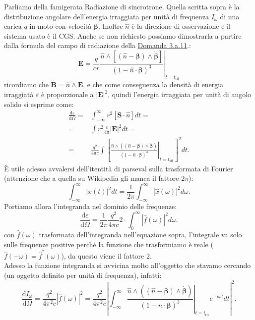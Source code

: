 \label{sec:3.a.14}
Parliamo della famigerata Radiazione di sincrotrone.
Quella scritta sopra è la distribuzione angolare dell'energia irraggiata per unità di frequenza $I_{\omega}$ di una carica $q$ in moto con velocità  $\boldsymbol{\beta}$. Inoltre $\hat{n}$ è la direzione di osservazione e il sistema usato è il CGS. 
Anche se non richiesto possiamo dimostrarla a partire dalla formula del campo di radiazione della \hyperref[sec:3.a.11]{Domanda 3.a.11}.:
\[
	\boldsymbol{E}= \left. \frac{q}{cr}
	\frac{\hat{n}\wedge\left[\left(\hat{n}-\boldsymbol{\beta}\right)\wedge\dot{\boldsymbol{\beta}}\right]}
	{\left(1-\hat{n}\cdot \boldsymbol{\beta}\right)^3} \right|_{t=t_{\text{rit}}}
\]
ricordiamo che $\boldsymbol{B}=\hat{n}\wedge \boldsymbol{E}$, e che come conseguenza la densità di energia irraggiatà $\varepsilon$ è proporzionale a $\left| \boldsymbol{E} \right| ^2$, quindi l'energia irraggiata per unità di angolo solido si esprime come:
\begin{align*}
	\frac{\mbox{d} \varepsilon}{\mbox{d} \Omega} =& \int_{-\infty}^{\infty}r^2 \left[ \boldsymbol{S}\cdot\hat{n}\right] dt =\\
	=& \int r^2 \frac{c}{4\pi}\left| \boldsymbol{E} \right|^2 dt = \\
	=& \frac{q^2}{4\pi c} \int \left[ \left. \frac{ \hat{n} \wedge \left( \left( \hat{n}-\boldsymbol{\beta} \right)\wedge\dot{\boldsymbol{\beta}}\right)}
		{\left( 1- \hat{n}\cdot \boldsymbol{\beta} \right)^3 } \right|_{t = t_{\text{rit}}} \right]^2 dt
.\end{align*}
È utile adesso avvalersi dell'itentità di parseval sulla trasformata di Fourier (attenzione che a quella su Wikipedia gli manca il fattore $2\pi$):
\[
	\int_{-\infty}^{\infty} \left| x\left( t \right)  \right|^2 dt = \frac{1}{2\pi} \int_{-\infty}^{\infty} \left| \hat{x}\left( \omega \right)\right|^2d\omega 
.\] 
Portiamo allora l'integranda nel dominio delle frequenze:
\[
	\frac{\mbox{d} \varepsilon}{\mbox{d} \Omega} = \frac{1}{2\pi}  \frac{q^2}{4\pi c} 2 \cdot\int_0^{\infty} \left| \hat{f}\left( \omega \right) \right|^2 d \omega 
.\] 
con $\hat{f}\left( \omega \right) $ trasformata dell'integranda nell'equazione sopra, l'integrale va solo sulle frequenze positive perchè la funzione che trasformiamo è reale ($\hat{f}\left( -\omega \right) = \hat{f}^*\left( \omega \right) $), da questo viene il fattore 2.\\
Adesso la funzione integranda si avvicina molto all'oggetto che stavamo cercando (un oggetto definito per unità di frequenza), infatti:
\[
	\frac{\mbox{d} I_{\omega}}{\mbox{d} \Omega} = \frac{q^2}{4\pi^2 c} \left| \hat{f}\left( \omega \right)  \right|^2 =  \frac{q^2}{4\pi^2 c} 
	\left| \int_{-\infty}^{\infty} \left. \frac{ \hat{n} \wedge \left( \left( \hat{n}-\boldsymbol{\beta} \right)\wedge\dot{\boldsymbol{\beta}}\right)}
		{\left( 1- \hat{n}\cdot \boldsymbol{\beta} \right)^3 } \right|_{t = t_{\text{rit}}} e^{-i\omega t} dt \right|^2 
.\]
